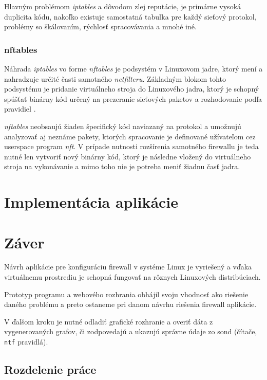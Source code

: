 Hlavným problémom \emph{iptables} a dôvodom zlej reputácie, je primárne vysoká duplicita kódu, nakoľko existuje samostatná tabuľka pre každý sieťový protokol, problémy so škálovaním, rýchlosť spracovávania a mnohé iné.

\subsection{nftables}
\label{nftables}
Náhrada \emph{iptables} vo forme \emph{nftables} je podsystém v Linuxovom jadre, ktorý mení a nahradzuje určité časti samotného \emph{netfilteru}. Základným blokom tohto podsystému je pridanie virtuálneho stroja do Linuxového jadra, ktorý je schopný spúšťať binárny kód určený na prezeranie sieťových paketov a rozhodovanie podľa pravidiel \cite{manpages, netfilter}. 

                                                                                 
\emph{nftables} neobsaujú žiaden špecifický kód naviazaný na protokol a umožnujú analyzovať aj neznáme pakety, ktorých spracovanie je definované užívateľom cez userspace program \emph{nft}. V prípade nutnosti rozšírenia samotného firewallu je teda nutné len vytvoriť nový binárny kód, ktorý je následne vložený do virtuálneho stroja na vykonávanie a mimo toho nie je potreba meniť žiadnu časť jadra.



\chapter{Implementácia aplikácie}


\chapter*{Záver}

	Návrh aplikácie pre konfiguráciu firewall v systéme Linux je vyriešený a vďaka virtuálnemu prostrediu je schopná
	fungovať na rôznych Linuxových distribúciach. 
	
	Prototyp programu a webového rozhrania obhájil svoju vhodnosť ako riešenie daného problému a preto ostaneme pri 
	danom návrhu riešenia firewall aplikácie.
	
	V ďalšom kroku je nutné odladiť grafické rozhranie a overiť dáta z vygenerovaných grafov, či zodpovedajú a ukazujú
	správne údaje zo sond (čítače, \texttt{ntf} pravidlá).

	\section{Rozdelenie práce}
	
